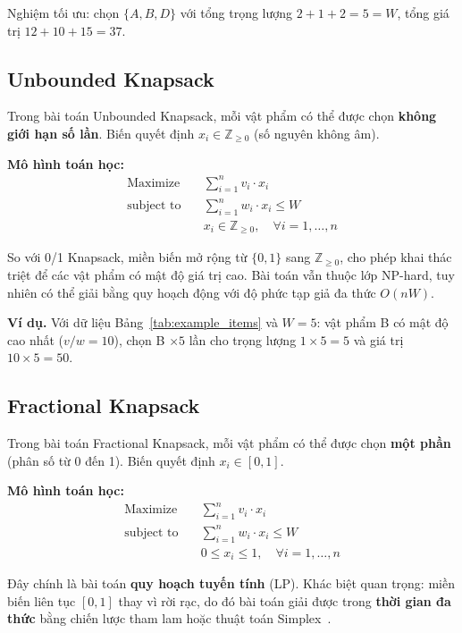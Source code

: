 Nghiệm tối ưu: chọn $\{A, B, D\}$ với tổng trọng lượng $2+1+2=5 = W$, tổng giá trị $12+10+15 = 37$.

\subsection{Unbounded Knapsack}

Trong bài toán Unbounded Knapsack, mỗi vật phẩm có thể được chọn \textbf{không giới hạn số lần}. Biến quyết định $x_i \in \mathbb{Z}_{\geq 0}$ (số nguyên không âm).

\textbf{Mô hình toán học:}
\begin{align}
    \text{Maximize} \quad & \sum_{i=1}^{n} v_i \cdot x_i \label{eq:ubobj} \\
    \text{subject to} \quad & \sum_{i=1}^{n} w_i \cdot x_i \leq W \label{eq:ubcap} \\
    & x_i \in \mathbb{Z}_{\geq 0}, \quad \forall i = 1, \ldots, n \label{eq:ubint}
\end{align}

So với 0/1 Knapsack, miền biến mở rộng từ $\{0,1\}$ sang $\mathbb{Z}_{\geq 0}$, cho phép khai thác triệt để các vật phẩm có mật độ giá trị cao. Bài toán vẫn thuộc lớp NP-hard, tuy nhiên có thể giải bằng quy hoạch động với độ phức tạp giả đa thức $O(nW)$.

\textbf{Ví dụ.} Với dữ liệu Bảng~\ref{tab:example_items} và $W=5$: vật phẩm B có mật độ cao nhất ($v/w = 10$), chọn B $\times 5$ lần cho trọng lượng $1 \times 5 = 5$ và giá trị $10 \times 5 = 50$.

\subsection{Fractional Knapsack}

Trong bài toán Fractional Knapsack, mỗi vật phẩm có thể được chọn \textbf{một phần} (phân số từ 0 đến 1). Biến quyết định $x_i \in [0, 1]$.

\textbf{Mô hình toán học:}
\begin{align}
    \text{Maximize} \quad & \sum_{i=1}^{n} v_i \cdot x_i \label{eq:frobj} \\
    \text{subject to} \quad & \sum_{i=1}^{n} w_i \cdot x_i \leq W \label{eq:frcap} \\
    & 0 \leq x_i \leq 1, \quad \forall i = 1, \ldots, n \label{eq:frfrac}
\end{align}

Đây chính là bài toán \textbf{quy hoạch tuyến tính} (LP). Khác biệt quan trọng: miền biến liên tục $[0,1]$ thay vì rời rạc, do đó bài toán giải được trong \textbf{thời gian đa thức} bằng chiến lược tham lam hoặc thuật toán Simplex~\cite{dantzig1957discrete}.

